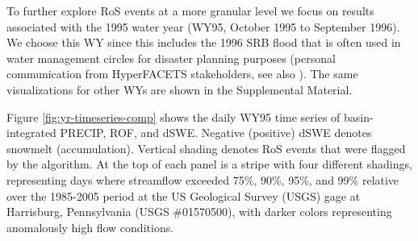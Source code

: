 \documentclass[nhess, manuscript]{copernicus}
\begin{document}

To further explore RoS events at a more granular level we focus on results associated with the 1995 water year (WY95, October 1995 to September 1996).
We choose this WY since this includes the 1996 SRB flood that is often used in water management circles for disaster planning purposes (personal communication from HyperFACETS stakeholders, see also \citet{jagannathan2021the}).
The same visualizations for other WYs are shown in the Supplemental Material.

Figure \ref{fig:yr-timeseries-comp} shows the daily WY95 time series of basin-integrated PRECIP, ROF, and dSWE.
Negative (positive) dSWE denotes snowmelt (accumulation).
Vertical shading denotes RoS events that were flagged by the algorithm.
At the top of each panel is a stripe with four different shadings, representing days where streamflow exceeded 75\%, 90\%, 95\%, and 99\% relative over the 1985-2005 period at the US Geological Survey (USGS) gage at Harrisburg, Pennsylvania (USGS \#01570500), with darker colors representing anomalously high flow conditions.
\end{document}
